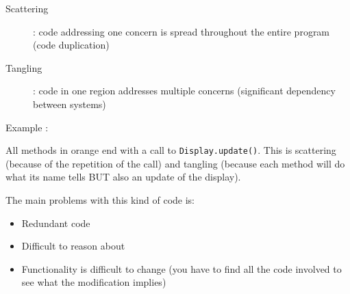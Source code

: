 \begin{solution}

\begin{description}
\item[Scattering]: code addressing one concern is spread throughout the entire program (code duplication)
\item[Tangling]: code in one region addresses multiple concerns (significant dependency between systems)
\end{description}

Example :

\begin{center}
\end{center}

All \textcolor{orange!80!black}{methods in orange} end with a call to \verb#Display.update()#. This is scattering (because of the repetition of the call) and tangling (because each method will do what its name tells BUT also an update of the display). \newline

The main problems with this kind of code is:

\begin{itemize}
\item Redundant code
\item Difficult to reason about
\item Functionality is difficult to change (you have to find all the code involved to see what the modification implies)
\end{itemize}

\end{solution}

